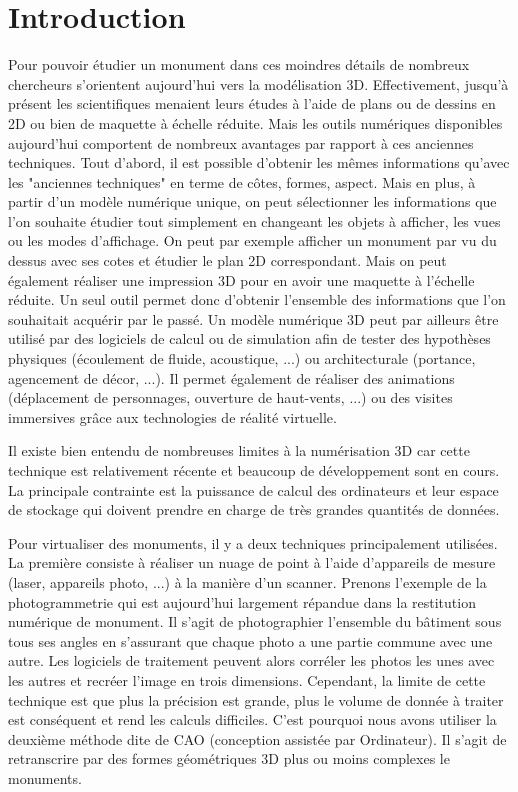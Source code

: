 		\section{Introduction}
		Pour pouvoir étudier un monument dans ces moindres détails de nombreux chercheurs s'orientent aujourd'hui vers la modélisation 3D. Effectivement, jusqu'à présent les scientifiques menaient leurs études à l'aide de plans ou de dessins en 2D ou bien de maquette à échelle réduite. Mais les outils numériques disponibles aujourd'hui comportent de nombreux avantages par rapport à ces anciennes techniques. Tout d'abord, il est possible d'obtenir les mêmes informations qu'avec les "anciennes techniques" en terme de côtes, formes, aspect. Mais en plus, à partir d'un modèle numérique unique, on peut sélectionner les informations que l'on souhaite étudier tout simplement en changeant les objets à afficher, les vues ou les modes d'affichage. On peut par exemple afficher un monument par vu du dessus avec ses cotes et étudier le plan 2D correspondant. Mais on peut également réaliser une impression 3D pour en avoir une maquette à l'échelle réduite. Un seul outil permet donc d'obtenir l'ensemble des informations que l'on souhaitait acquérir par le passé. Un modèle numérique 3D peut par ailleurs être utilisé par des logiciels de calcul ou de simulation afin de tester des hypothèses physiques (écoulement de fluide, acoustique, ...) ou architecturale (portance, agencement de décor, ...). Il permet également de réaliser des animations (déplacement de personnages, ouverture de haut-vents, ...) ou des visites immersives grâce aux technologies de réalité virtuelle. 

Il existe bien entendu de nombreuses limites à la numérisation 3D car cette technique est relativement récente et beaucoup de développement sont en cours. La principale contrainte est la puissance de calcul des ordinateurs et leur espace de stockage qui doivent prendre en charge de très grandes quantités de données.

Pour virtualiser des monuments, il y a deux techniques principalement utilisées. La première consiste à réaliser un nuage de point à l'aide d'appareils de mesure (laser, appareils photo, ...) à la manière d'un scanner. Prenons l'exemple de la photogrammetrie qui est aujourd'hui largement répandue dans la restitution numérique de monument. Il s'agit de photographier l'ensemble du bâtiment sous tous ses angles en s'assurant que chaque photo a une partie commune avec une autre. Les logiciels de traitement peuvent alors corréler les photos les unes avec les autres et recréer l'image en trois dimensions. Cependant, la limite de cette technique est que plus la précision est grande, plus le volume de donnée à traiter est conséquent et rend les calculs difficiles. C'est pourquoi nous avons utiliser la deuxième méthode dite de CAO (conception assistée par Ordinateur). Il s'agit de retranscrire par des formes géométriques 3D plus ou moins complexes le monuments.


